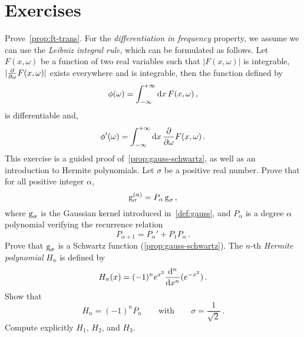 \section{Exercises}
\begin{ExerciseList}
  \Exercise[label=ft-trans] Prove~\cref{prop:ft-trans}. For the \emph{differentiation in frequency}
  property, we assume we can use the \emph{Leibniz integral rule}, which can be formulated as follows.
  Let $F(x,\omega)$ be a function of two real variables such that $|F(x,\omega)|$ is integrable,
  $|\smash{\frac{\partial }{\partial \omega}F(x,\omega)}|$ exists everywhere and is integrable, then the function defined
  by
  \begin{equation}
    \phi(\omega)=\int_{-\infty}^{+\infty}\mathrm{d}{x}\,F(x,\omega)\,,
  \end{equation}
  is differentiable and,
  \begin{equation}
    \phi'(\omega)=\int_{-\infty}^{+\infty}\mathrm{d}{x}\,\frac{\partial }{\partial \omega}F(x,\omega)\,.
  \end{equation}
  \Exercise[label=gauss-schwartz] This exercise is a guided proof
  of~\cref{prop:gauss-schwartz}, as well as an introduction
  to Hermite polynomials.
  \Question Let $\sigma$ be a positive real number. Prove that for all positive
  integer $\alpha$,
  \begin{equation}
    \operatorname{g}_{\sigma}^{(\alpha)}=P_{\alpha}\operatorname{g}_{\sigma}\,,
  \end{equation}
  where $\operatorname{g}_{\sigma}$ is the Gaussian kernel introduced in~\cref{def:gauss},
  and $P_{\alpha}$ is a degree $\alpha$ polynomial verifying the recurrence relation
  \begin{equation}
    P_{\alpha+1}=P_{\alpha}'+P_1P_{\alpha}\,.
  \end{equation}
  \Question Prove that $\operatorname{g}_{\sigma}$ is a Schwartz function (\cref{prop:gauss-schwartz}).
  \Question The $n$-th \emph{Hermite polynomial} $H_n$ is defined by
  \begin{equation}
    H_n(x)=(-1)^ne^{x^2}\frac{\mathrm{d}^n}{\mathrm{d} x^n}(e^{-x^2})\,.
  \end{equation}
  Show that
  \begin{equation}
    H_n=(-1)^nP_n\qquad\text{with}\qquad \sigma=\frac{1}{\sqrt{2}}\,.
  \end{equation}
  \Question Compute explicitly $H_1$, $H_2$, and $H_3$.

\end{ExerciseList}
